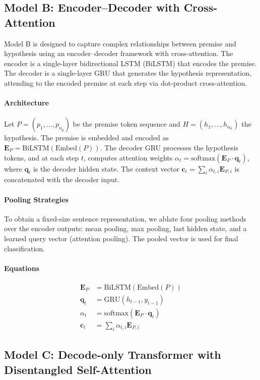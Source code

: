 \documentclass[11pt]{article}
\begin{document}
\subsection{Model B: Encoder--Decoder with Cross-Attention}
Model B is designed to capture complex relationships between premise and hypothesis using an encoder--decoder framework with cross-attention. The encoder is a single-layer bidirectional LSTM (BiLSTM) that encodes the premise. The decoder is a single-layer GRU that generates the hypothesis representation, attending to the encoded premise at each step via dot-product cross-attention.

\paragraph{Architecture}
Let $P = (p_1, \ldots, p_{n_p})$ be the premise token sequence and $H = (h_1, \ldots, h_{n_h})$ the hypothesis. The premise is embedded and encoded as $\mathbf{E}_P = \mathrm{BiLSTM}(\mathrm{Embed}(P))$. The decoder GRU processes the hypothesis tokens, and at each step $t$, computes attention weights $\alpha_t = \mathrm{softmax}(\mathbf{E}_P \cdot \mathbf{q}_t)$, where $\mathbf{q}_t$ is the decoder hidden state. The context vector $\mathbf{c}_t = \sum_i \alpha_{t,i} \mathbf{E}_{P,i}$ is concatenated with the decoder input.

\paragraph{Pooling Strategies}
To obtain a fixed-size sentence representation, we ablate four pooling methods over the encoder outputs: mean pooling, max pooling, last hidden state, and a learned query vector (attention pooling). The pooled vector is used for final classification.

\paragraph{Equations}
\begin{align}
\mathbf{E}_P &= \mathrm{BiLSTM}(\mathrm{Embed}(P)) \\
\mathbf{q}_t &= \mathrm{GRU}(h_{t-1}, y_{t-1}) \\
\alpha_t &= \mathrm{softmax}(\mathbf{E}_P \cdot \mathbf{q}_t) \\
\mathbf{c}_t &= \sum_i \alpha_{t,i} \mathbf{E}_{P,i}
\end{align}

\subsection{Model C: Decode-only Transformer with Disentangled Self-Attention}
\label{sec:methods-danli}
\end{document}
